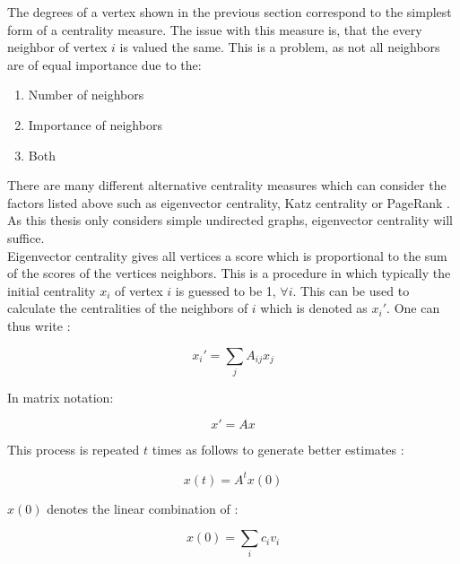 	\noindent The degrees of a vertex shown in the previous section correspond 
	to the simplest form of a centrality measure. The issue with this measure 
	is, that the every neighbor of vertex $i$ is valued the same. This is a 
	problem, as not all neighbors are of equal importance due to the:

	\begin{enumerate}
		\item Number of neighbors
		\item Importance of neighbors
		\item Both
	\end{enumerate}

	\noindent There are many different alternative centrality measures which
	can consider the factors listed above such as eigenvector centrality, Katz
	centrality or PageRank
	\citep{katz1953new,page1999pagerank,landau1895relativen,Newman2010}. As
	this thesis only considers simple undirected graphs, eigenvector centrality 
	will suffice. \\

	\noindent Eigenvector centrality gives all vertices a score which is 
	proportional to the sum of the scores of the vertices neighbors. This is a 
	procedure in which typically the initial centrality $x_i$ of vertex $i$ is 
	guessed to be 1, $\forall i$. This can be used to calculate the 
	centralities of the neighbors of $i$ which is denoted as $x_{i}'$. One can 
	thus write \citep[p. 169]{Newman2010}:

	\begin{equation}
		x_i' = \sum_{j}A_{ij}x_j
	\end{equation}

	\noindent In matrix notation:

	\begin{equation}
		x' = Ax
	\end{equation}

	\noindent This process is repeated $t$ times as follows to generate better 
	estimates \citep[p. 170]{Newman2010}:

	\begin{equation}
		x(t) =  A^tx(0)
	\end{equation}

	\noindent $x(0)$ denotes the linear combination of 
	\citep[p. 170]{Newman2010}:

	\begin{equation}
		x(0) =  \sum_{i}c_{i}v_{i}
	\end{equation}

